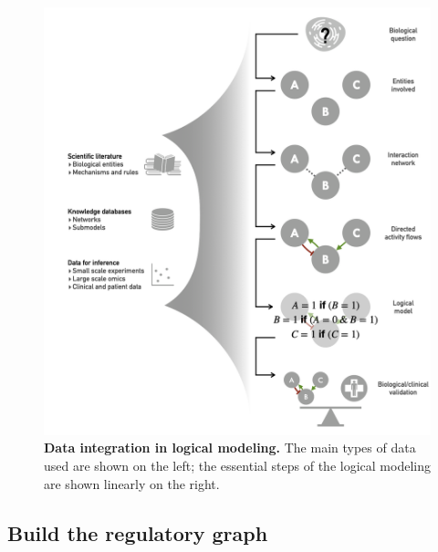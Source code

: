 \documentclass[a4paper,12pt,twoside,onecolumn,openright,final,oldfontcommands]{memoir}
\begin{document}
\begin{figure}

{\centering \includegraphics[width=0.9\linewidth]{fig/logical-data} 

}

\caption[Main principles of MaBoSS simulation framework and Gillespie algorithm]{\textbf{Data integration in logical
modeling.} The main types of data used are shown on the left; the
essential steps of the logical modeling are shown linearly on the right.}\label{fig:logical-data}
\end{figure}





\subsection{Build the regulatory
graph}\label{build-the-regulatory-graph}
\end{document}
